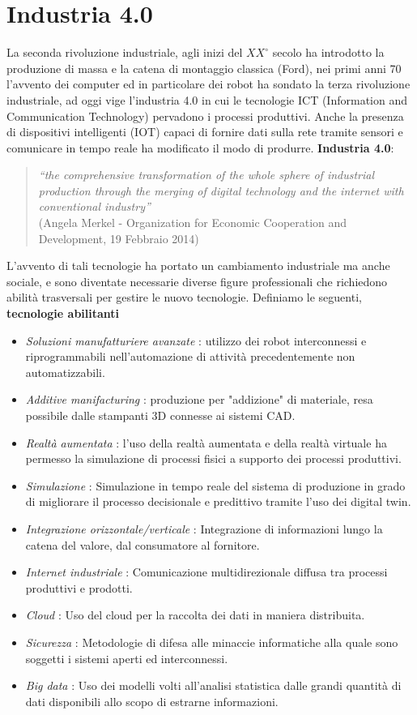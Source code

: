 \documentclass[10pt, letterpaper]{report}
\begin{document}
\section{Industria 4.0}
La seconda rivoluzione industriale, agli inizi del $XX^\circ$ secolo ha introdotto la produzione di massa e la catena 
di montaggio classica (Ford), nei primi anni 70 l'avvento dei computer ed in particolare dei robot ha sondato la 
terza rivoluzione industriale, ad oggi vige l'industria 4.0 in cui le tecnologie ICT (Information and Communication Technology)
pervadono i processi produttivi. Anche la presenza di dispositivi intelligenti (IOT) capaci di fornire dati 
sulla rete tramite sensori e comunicare in tempo reale ha modificato il modo di produrre.\acc 
\textbf{Industria 4.0}:\begin{quote}
    \textit{“the comprehensive transformation of the whole sphere of
industrial production through the merging of digital technology and
the internet with conventional industry”} \\(Angela Merkel - Organization for
Economic Cooperation and Development, 19 Febbraio 2014)
\end{quote}
L'avvento di tali tecnologie ha portato un cambiamento industriale ma  anche sociale, e sono diventate necessarie 
diverse figure professionali che richiedono abilità trasversali per gestire le nuovo tecnologie. Definiamo le seguenti, 
\textbf{tecnologie abilitanti}\begin{itemize}
    \item \textit{Soluzioni manufatturiere avanzate} : utilizzo dei robot interconnessi e riprogrammabili 
    nell'automazione di attività precedentemente non automatizzabili.
    \item \textit{Additive manifacturing} : produzione per "addizione" di materiale, resa possibile dalle stampanti 
    3D connesse ai sistemi CAD. 
    \item \textit{Realtà aumentata} : l'uso della realtà aumentata e della realtà virtuale ha permesso la 
     simulazione di processi fisici a supporto dei processi produttivi. 
     \item \textit{Simulazione} : Simulazione in tempo reale del sistema di produzione in grado di 
        migliorare il processo decisionale e predittivo tramite l'uso dei digital twin.
    \item \textit{Integrazione orizzontale/verticale} : Integrazione di informazioni lungo la catena del valore, dal consumatore 
    al fornitore. 
    \item \textit{Internet industriale} : Comunicazione multidirezionale diffusa tra processi produttivi e prodotti. 
    \item \textit{Cloud} : Uso del cloud per la raccolta dei dati in maniera distribuita.  
    \item \textit{Sicurezza} : Metodologie di difesa alle minaccie informatiche alla quale sono soggetti i 
    sistemi aperti ed interconnessi.  
    \item \textit{Big data} : Uso dei modelli volti all'analisi statistica dalle grandi quantità di dati 
    disponibili allo scopo di estrarne informazioni. 
\end{itemize}
\end{document}
